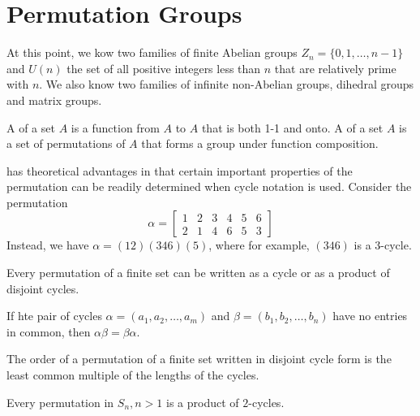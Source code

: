 \documentclass[12pt]{scrartcl}
\begin{document}
\section{Permutation Groups}

At this point, we kow two families of finite Abelian groups $Z_n = \{0, 1, \ldots, n-1\}$
and $U(n)$ the set of all positive integers less than $n$ that are relatively prime with $n$. We also know two families 
of infinite non-Abelian groups, dihedral groups and matrix groups. 

\begin{definition}
  A  of a set $A$ is a function from $A$ to $A$ that is both 1-1 and onto. A  of a set $A$ 
  is a set of permutations of $A$ that forms a group under function composition. 
\end{definition}

\begin{definition}
   has theoretical advantages in that certain important properties of the permutation can be readily determined 
  when cycle notation is used. Consider the permutation 
  \[\alpha = \begin{bmatrix}
    1 & 2 & 3 & 4 & 5 & 6\\
    2 & 1 & 4 & 6 & 5 & 3
  \end{bmatrix}\]
  Instead, we have $\alpha= (12)(346)(5)$, where for example, $(346)$ is a 3-cycle. 
\end{definition}

\begin{theorem}
  Every permutation of a finite set can be written as a cycle or as a product of disjoint cycles. 
\end{theorem}

\begin{theorem}
  If hte pair of cycles $\alpha = (a_1, a_2, \ldots, a_m)$ and $\beta = (b_1, b_2, \ldots, b_n)$ have no entries in common, then 
  $\alpha \beta = \beta \alpha$. 
\end{theorem}

\begin{theorem}
  The order of a permutation of a finite set written in disjoint cycle form is the least common multiple of the lengths of the cycles. 
\end{theorem}

\begin{theorem}
  Every permutation in $S_n, n > 1$ is a product of $2$-cycles. 
\end{theorem}
\end{document}
